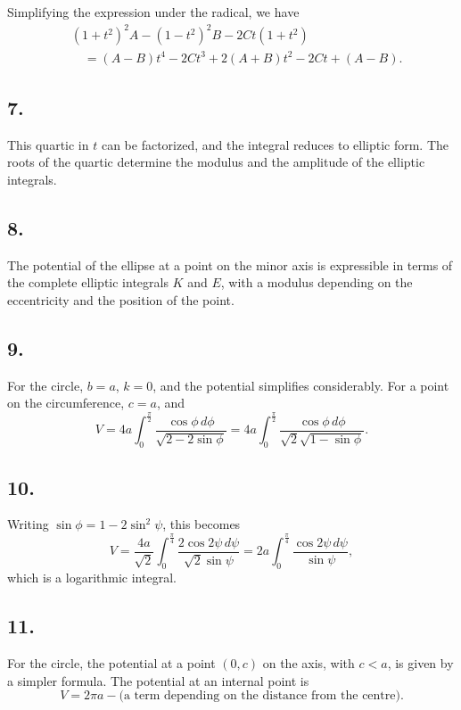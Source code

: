\documentclass[11pt,a4paper]{article}
\begin{document}
Simplifying the expression under the radical, we have
\begin{align*}
&(1+t^2)^2A - (1-t^2)^2B - 2Ct(1+t^2) \\
&\quad = (A-B)t^4 - 2Ct^3 + 2(A+B)t^2 - 2Ct + (A-B).
\end{align*}

\subsection*{7.}

This quartic in $t$ can be factorized, and the integral reduces to elliptic
form. The roots of the quartic determine the modulus and the amplitude of
the elliptic integrals.

\newpage
\subsection*{8.}

The potential of the ellipse at a point on the minor axis is expressible in
terms of the complete elliptic integrals $K$ and $E$, with a modulus depending
on the eccentricity and the position of the point.

\subsection*{9.}

For the circle, $b=a$, $k=0$, and the potential simplifies considerably.
For a point on the circumference, $c=a$, and
\[
V = 4a \int_0^{\frac{\pi}{2}} \frac{\cos\phi\,d\phi}{\sqrt{2-2\sin\phi}}
  = 4a \int_0^{\frac{\pi}{2}}
    \frac{\cos\phi\,d\phi}{\sqrt{2}\sqrt{1-\sin\phi}}.
\]

\subsection*{10.}

Writing $\sin\phi=1-2\sin^2\psi$, this becomes
\[
V = \frac{4a}{\sqrt{2}} \int_0^{\frac{\pi}{4}}
    \frac{2\cos 2\psi\,d\psi}{\sqrt{2}\sin\psi}
  = 2a \int_0^{\frac{\pi}{4}} \frac{\cos 2\psi\,d\psi}{\sin\psi},
\]
which is a logarithmic integral.

\subsection*{11.}

For the circle, the potential at a point $(0,c)$ on the axis, with $c<a$,
is given by a simpler formula. The potential at an internal point is
\[
V = 2\pi a - \text{(a term depending on the distance from the centre)}.
\]
\end{document}
